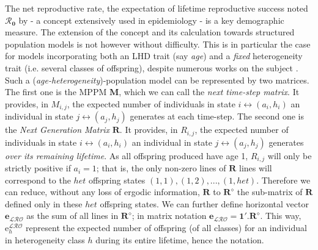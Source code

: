 \documentclass[10pt,a4paper]{article}
\newcommand{\M}{$\mathbf{M}$}
\newcommand{\Rzero}{$\boldsymbol{\mathcal{R}_{0}}$  }
\begin{document}
{{The net reproductive rate, the expectation of lifetime reproductive success noted \Rzero by \citet{Dublin1925} - a concept extensively used in epidemiology \citep[see review by ][]{Heesterbeek2002}- is a key demographic measure.
The extension of the concept and its calculation towards structured population models is not however without difficulty. This is in particular the case for models incorporating both an LHD trait (say \emph{age}) and a \emph{fixed} heterogeneity trait (i.e. several classes of offspring), despite numerous works on the subject  \citep[see for instance][]{DeCaminoBeck2008,Caswell2011b,Cushing1994}.
Such a (\emph{age-heterogeneity})-population model can be represented by two matrices. The first one is the MPPM \M, which we can call the \emph{next time-step matrix}. It provides, in $M_{i,j}$, the expected number of individuals in state $i\leftrightarrow (a_{i},h_{i})$ an individual in state $j\leftrightarrow (a_{j},h_{j})$ generates at each time-step.
The second one is the \emph{Next Generation Matrix} $\mathbf{R}$. It provides, in $R_{i,j}$,  the expected number of individuals in state $i\leftrightarrow (a_{i},h_{i})$ an individual in state $j\leftrightarrow (a_{j},h_{j})$ generates \emph{over its remaining lifetime}.
As all offspring produced have age 1, $R_{i,j}$ will only be strictly positive if $a_{i}=1$; that is, the only non-zero lines of $\mathbf{R}$ lines will correspond to the $het$ offspring states $(1,1), (1,2), ..., (1,het)$. Therefore we can reduce, without any loss of ergodic information, $\mathbf{R}$ to $\mathbf{R^{\diamond}}$ the sub-matrix of $\mathbf{R}$ defined only in these $het$ offspring states. We can further define horizontal vector $\mathbf{e}_{\mathcal{LRO}}$ as the sum of all lines in $\mathbf{R^{\diamond}}$; in matrix notation $\mathbf{e}_{\mathcal{LRO}}=\mathbf{1}'.\mathbf{R^{\diamond}}$. This way, $\mathrm{e}^{\mathcal{LRO}}_{h}$ represent the expected number of offspring (of all classes) for an individual in heterogeneity class $h$ during its entire lifetime, hence the notation.\\

}}
\end{document}
